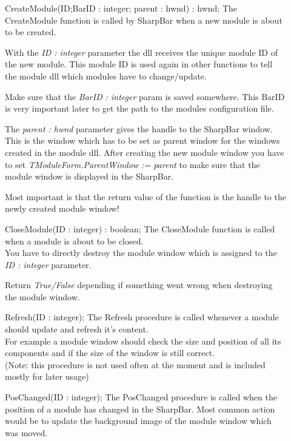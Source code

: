 \documentclass[a4paper]{article}
\begin{document}
  \medskip
  \begin{description}
    \item[]{ CreateModule(ID;BarID : integer; parent : hwnd) : hwnd;}  \medbreak    
      The CreateModule function is called by SharpBar when a new module is about to be created. 

      With the {\it ID : integer} parameter the dll receives the unique module ID of the new module. This module ID is used again in other functions to tell the module dll which modules have to change/update. 
      
      Make sure that the {\it BarID : integer} param is saved somewhere. This BarID is very important later to get the path to the modules configuration file.

      The {\it parent : hwnd} parameter gives the handle to the SharpBar window. This is the window which has to be set as parent window for the windows created in the module dll. After creating the new module window you have to set {\it TModuleForm.ParentWindow := parent} to make sure that the module window is displayed in the SharpBar. 

      Most important is that the return value of the function is the handle to the newly created module window! 
      
      \bigbreak
    \item[]{ CloseModule(ID : integer) : boolean;}  \medbreak
      The CloseModule function is called when a module is about to be closed. \\
      You have to directly destroy the module window which is assigned to the {\it ID : integer} parameter. 

      Return {\it True/False} depending if something went wrong when destroying the module window.     
      
      \bigbreak
    \item[]{ Refresh(ID : integer);}  \medbreak
      The Refresh procedure is called whenever a module should update and refresh it's content. \\
      For example a module window should check the size and position of all its components and if the size of the window is still correct.\\
      (Note: this procedure is not used often at the moment and is included mostly for later usage)
      
      \bigbreak
    \item[]{ PosChanged(ID : integer);}  \medbreak
      The PosChanged procedure is called when the position of a module has changed in the SharpBar. Most common action would be to update the background image of the module window which was moved. 
      

\end{description}
\end{document}
